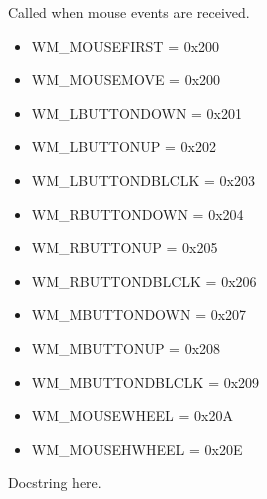 \documentclass[letterpaper,10pt,english]{sphinxmanual}
\begin{document}
\begin{fulllineitems}
\begin{fulllineitems}
\end{fulllineitems}


\begin{fulllineitems}
\label{threads:threads.inputcapture.INPUT_CAPTURE.on_mouse_event}
Called when mouse events are received.
\begin{itemize}
\item {} 
WM\_MOUSEFIRST = 0x200

\item {} 
WM\_MOUSEMOVE = 0x200

\item {} 
WM\_LBUTTONDOWN = 0x201

\item {} 
WM\_LBUTTONUP = 0x202

\item {} 
WM\_LBUTTONDBLCLK = 0x203

\item {} 
WM\_RBUTTONDOWN = 0x204

\item {} 
WM\_RBUTTONUP = 0x205

\item {} 
WM\_RBUTTONDBLCLK = 0x206

\item {} 
WM\_MBUTTONDOWN = 0x207

\item {} 
WM\_MBUTTONUP = 0x208

\item {} 
WM\_MBUTTONDBLCLK = 0x209

\item {} 
WM\_MOUSEWHEEL = 0x20A

\item {} 
WM\_MOUSEHWHEEL = 0x20E

\end{itemize}

\end{fulllineitems}


\begin{fulllineitems}
\label{threads:threads.inputcapture.INPUT_CAPTURE.reset_mouse_events}
Docstring here.

\end{fulllineitems}


\end{fulllineitems}
\end{document}
